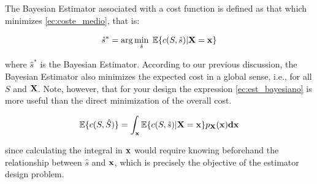 The Bayesian Estimator associated with a cost function is defined {as} that which minimizes \eqref{ec:coste_medio}, that is:

\begin{equation}
\label{ec:est_bayesiano}
{\hat s}^* = \arg\min_{\hat s}\;\mathbb{E}\{c(S,\hat s)|{\bf X} = {\bf x} \}
\end{equation}

where $\hat s^*$ is the Bayesian Estimator. According to our previous discussion, the Bayesian Estimator also minimizes the expected cost in a global sense, i.e., for all $S$ and ${\bf X}$. Note, however, that for your design the expression \eqref{ec:est_bayesiano} is more useful than the direct minimization of the overall cost.

\begin{equation}
\mathbb{E}\{c(S,\hat S)\} = \int_{\bf x} \mathbb{E}\{c(S,\hat s)|{\bf X} = {\bf x} \} p_{\bf X}(\bf x) d{\bf x}
\end{equation}

since calculating the integral in ${\bf x}$ would require knowing beforehand the relationship between $\hat s$ and $\bf x$, which is precisely the objective of the estimator design problem.

